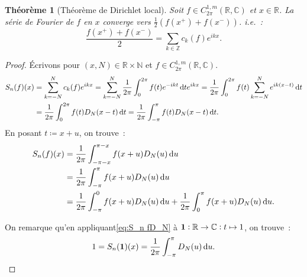\documentclass{report}
\newtheorem{thm}{Théorème}[chapter]
\theoremstyle{definition}
\theoremstyle{remark}
\numberwithin{equation}{section}
\newcommand{\C}{\mathbb C}
\newcommand{\R}{\mathbb R}
\newcommand{\Z}{\mathbb Z}
\newcommand{\N}{\mathbb N}
\begin{document}
			\begin{thm}[Théorème de Dirichlet local]\label{thm:Dirichlet local} Soit $f \in C^{1,m}_{2\pi}(\R, \C)$ et $x \in \R$. La série de Fourier de $f$ en $x$
			converge vers $\frac 12(f(x^+) + f(x^-))$. i.e.~:
			\begin{equation}
				\frac {f(x^+) + f(x^-)}2 = \sum_{k \in \Z}c_k(f)e^{ikx}.
			\end{equation}
			\end{thm}

			\begin{proof} Écrivons pour $(x, N) \in \R \times \N$ et $f \in C^{1,m}_{2\pi}(\R, \C)$.
			\begin{align}
				S_n(f)(x) &= \sum_{k=-N}^Nc_k(f)e^{ikx} = \sum_{k=-N}^N\frac 1{2\pi}\int_0^{2\pi}f(t)e^{-ikt}\dif te^{ikx} = \frac 1{2\pi}\int_0^{2\pi}f(t)\sum_{k=-N}^Ne^{ik(x-t)}\dif t \\
				&= \frac 1{2\pi}\int_0^{2\pi}f(t)D_N(x-t)\dif t = \frac 1{2\pi}\int_{-\pi}^{\pi}f(t)D_N(x-t)\dif t.
			\end{align}
			En posant $t \coloneqq x+u$, on trouve~:
			\begin{align}
				S_n(f)(x) &= \frac 1{2\pi}\int_{-\pi-x}^{\pi-x}f(x+u)D_N(u)\dif u  \\
					&= \frac 1{2\pi}\int_{-\pi}^{\pi}f(x+u)D_N(u)\dif u \label{eq:S_n fD_N}\\
					&= \frac 1{2\pi}\int_{-\pi}^0 f(x+u)D_N(u)\dif u + \frac 1{2\pi}\int_0^\pi f(x+u)D_N(u)\dif u.
			\end{align}

			On remarque qu'en appliquant\eqref{eq:S_n fD_N} à ${\bf 1} : \R \to \C : t \mapsto 1$, on trouve~:
			\begin{equation}
				1 = S_n({\bf 1})(x) = \frac 1{2\pi}\int_{-\pi}^\pi D_N(u)\dif u.
			\end{equation}


\end{proof}
\end{document}
